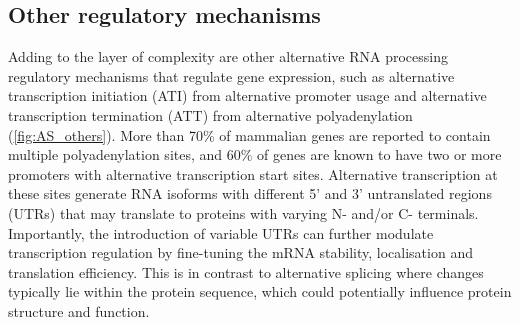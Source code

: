 \newpage
\subsection{Other regulatory mechanisms}
Adding to the layer of complexity are other alternative RNA processing regulatory mechanisms that regulate gene expression, such as alternative transcription initiation (ATI) from alternative promoter usage and alternative transcription termination (ATT) from alternative polyadenylation (\cref{fig:AS_others}). More than 70\% of mammalian genes are reported to contain multiple polyadenylation sites, and 60\% of genes are known to have two or more promoters with alternative transcription start sites\cite{Carninci2006}. Alternative transcription at these sites generate RNA isoforms with different 5' and 3' untranslated regions (UTRs) that may translate to proteins with varying N- and/or C- terminals. Importantly, the introduction of variable UTRs can further modulate transcription regulation by fine-tuning the mRNA stability, localisation and translation efficiency\cite{Reyes2018}. This is in contrast to alternative splicing where changes typically lie within the protein sequence, which could potentially influence protein structure and function.

